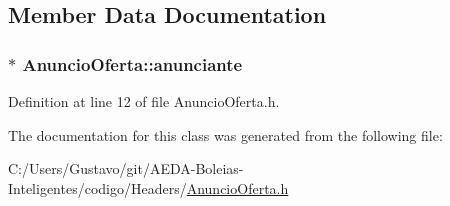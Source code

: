 \subsection{Member Data Documentation}
\hypertarget{class_anuncio_oferta_a5de28c6a5a698a5ddabcf258c3c42d3c}{
\subsubsection[{anunciante}]{$\ast$ Anuncio\+Oferta\+::anunciante\hspace{0.3cm}{\ttfamily [private]}}}\label{class_anuncio_oferta_a5de28c6a5a698a5ddabcf258c3c42d3c}


Definition at line 12 of file Anuncio\+Oferta.\+h.



The documentation for this class was generated from the following file\+:\begin{DoxyCompactItemize}
\item 
C\+:/\+Users/\+Gustavo/git/\+A\+E\+D\+A-\/\+Boleias-\/\+Inteligentes/codigo/\+Headers/\hyperlink{_anuncio_oferta_8h}{Anuncio\+Oferta.\+h}\end{DoxyCompactItemize}
